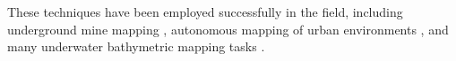 These techniques have been employed successfully in the field, including underground mine mapping \cite{ATLAS}, autonomous mapping of urban environments \cite{ref:Montemerlo}, and many underwater bathymetric mapping tasks \cite{}.

%
%
